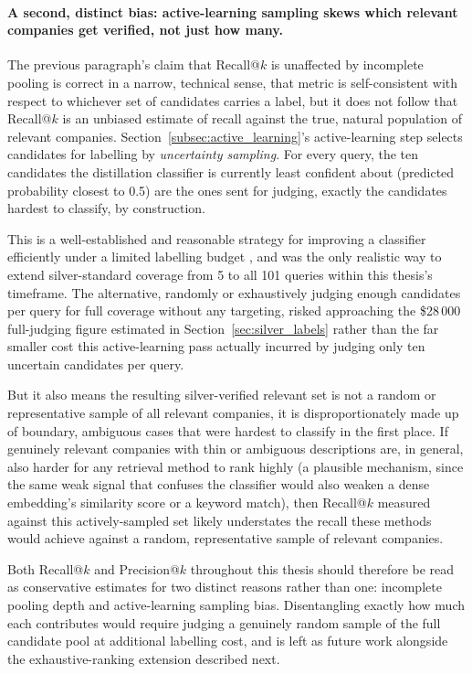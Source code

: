 \documentclass[a4paper,oneside,bibliography=totoc]{scrbook}
\begin{document}
\paragraph{A second, distinct bias: active-learning sampling skews which relevant companies get verified, not just how many.} The previous paragraph's claim that Recall@$k$ is unaffected by incomplete pooling is correct in a narrow, technical sense, that metric is self-consistent with respect to whichever set of candidates carries a label, but it does not follow that Recall@$k$ is an unbiased estimate of recall against the true, natural population of relevant companies. Section~\ref{subsec:active_learning}'s active-learning step selects candidates for labelling by \emph{uncertainty sampling}. For every query, the ten candidates the distillation classifier is currently least confident about (predicted probability closest to 0.5) are the ones sent for judging, exactly the candidates hardest to classify, by construction.

This is a well-established and reasonable strategy for improving a classifier efficiently under a limited labelling budget \citep{settles2009active}, and was the only realistic way to extend silver-standard coverage from 5 to all 101 queries within this thesis's timeframe. The alternative, randomly or exhaustively judging enough candidates per query for full coverage without any targeting, risked approaching the \$28\,000 full-judging figure estimated in Section~\ref{sec:silver_labels} rather than the far smaller cost this active-learning pass actually incurred by judging only ten uncertain candidates per query.

But it also means the resulting silver-verified relevant set is not a random or representative sample of all relevant companies, it is disproportionately made up of boundary, ambiguous cases that were hardest to classify in the first place. If genuinely relevant companies with thin or ambiguous descriptions are, in general, also harder for any retrieval method to rank highly (a plausible mechanism, since the same weak signal that confuses the classifier would also weaken a dense embedding's similarity score or a keyword match), then Recall@$k$ measured against this actively-sampled set likely understates the recall these methods would achieve against a random, representative sample of relevant companies. 

Both Recall@$k$ and Precision@$k$ throughout this thesis should therefore be read as conservative estimates for two distinct reasons rather than one: incomplete pooling depth and active-learning sampling bias. Disentangling exactly how much each contributes would require judging a genuinely random sample of the full candidate pool at additional labelling cost, and is left as future work alongside the exhaustive-ranking extension described next.
\end{document}
